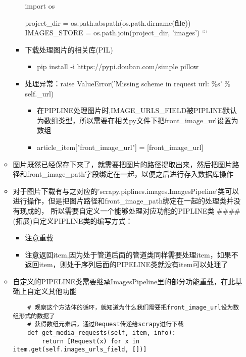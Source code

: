\documentclass[11pt]{article}
\providecommand{\tightlist}{%
      \setlength{\itemsep}{0pt}\setlength{\parskip}{0pt}}
\begin{document}
\begin{enumerate}
\begin{itemize}
\begin{itemize}
      import os

      project\_dir = os.path.abspath(os.path.dirname(\textbf{file}))
      IMAGES\_STORE = os.path.join(project\_dir, 'images') ```
    \item
      下载处理图片的相关库(PIL)

      \begin{itemize}
      \tightlist
      \item
        pip install -i https://pypi.douban.com/simple pillow
      \end{itemize}
    \item
      处理异常：raise ValueError('Missing scheme in request url: \%s' \%
      self.\_url)

      \begin{itemize}
      \tightlist
      \item
        在PIPLINE处理图片时,IMAGE\_URLS\_FIELD被PIPLINE默认为数组类型，所以需要在相关py文件下把front\_image\_url设置为数组
      \item
        article\_item{[}"front\_image\_url"{]} = {[}front\_image\_url{]}
      \end{itemize}
    \end{itemize}
  \item
    图片既然已经保存下来了，就需要把图片的路径提取出来，然后把图片路径和front\_image\_path字段绑定在一起，以便之后进行存入数据库操作
  \item
    对于图片下载有与之对应的'scrapy.piplines.images.ImagesPipeline'类可以进行操作，但是把图片路径和front\_image\_path绑定在一起的处理类并没有现成的，
    所以需要自定义一个能够处理对应功能的PIPLINE类 \#\#\#\#
    (拓展)自定义PIPLINE类的编写方式：

    \begin{itemize}
    \tightlist
    \item
      注意重载
    \item
      注意返回item,因为处于管道后面的管道类同样需要处理item，如果不返回item，则处于序列后面的PIPELINE类就没有item可以处理了
    \end{itemize}
  \item
    自定义的PIPELINE类需要继承ImagesPipeline里的部分功能重载，在此基础上自定义其他功能

\begin{verbatim}
    # 观察这个方法体的循环，就知道为什么我们需要把front_image_url设为数组形式的数据了
    # 获得数组元素后，通过Request传递给scrapy进行下载
    def get_media_requests(self, item, info):
        return [Request(x) for x in item.get(self.images_urls_field, [])]
\end{verbatim}


\end{itemize}
\end{enumerate}
\end{document}
